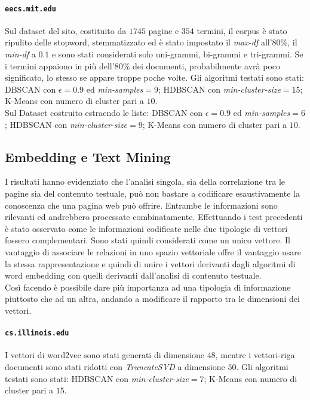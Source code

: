 \paragraph{\texttt{eecs.mit.edu}}
Sul dataset del sito, costituito da $1745$ pagine e $354$ termini, il corpus è stato ripulito delle stopword, stemmatizzato ed è stato impostato il \textit{max-df} all'80\%, il \textit{min-df} a $0.1$ e sono stati considerati solo uni-grammi, bi-grammi e tri-grammi. Se i termini appaiono in più dell'80\% dei documenti, probabilmente avrà poco significato, lo stesso se appare troppe poche volte. Gli algoritmi testati sono stati: DBSCAN con $\epsilon = 0.9$ ed \textit{min-samples}$ = 9$; HDBSCAN con \textit{min-cluster-size}$=15$; K-Means con numero di cluster pari a $10$. \\Sul Dataset costruito estraendo le liste: DBSCAN con $\epsilon = 0.9$ ed \textit{min-samples}$ = 6$; HDBSCAN con \textit{min-cluster-size}$=9$; K-Means con numero di cluster pari a $10$. 

\subsection{Embedding e Text Mining}
I risultati hanno evidenziato che l'analisi singola, sia della correlazione tra le pagine sia del contenuto testuale, può non bastare a codificare esaustivamente la conoscenza che una pagina web può offrire. Entrambe le informazioni sono rilevanti ed andrebbero processate combinatamente. Effettuando i test precedenti è stato osservato come le informazioni codificate nelle due tipologie di vettori fossero complementari. Sono stati quindi considerati come un unico vettore. Il vantaggio di associare le relazioni in uno spazio vettoriale offre il vantaggio usare la stessa rappresentazione e quindi di unire i vettori derivanti dagli algoritmi di word embedding con quelli derivanti dall'analisi di contenuto testuale. 
\\
Così facendo è possibile dare più importanza ad una tipologia di informazione piuttosto che ad un altra, andando a modificare il rapporto tra le dimensioni dei vettori.


\paragraph{\texttt{cs.illinois.edu}} I vettori di word2vec sono stati generati di dimensione $48$, mentre i vettori-riga documenti sono stati ridotti con \textit{TruncateSVD} a dimensione $50$. Gli algoritmi testati sono stati: HDBSCAN con \textit{min-cluster-size}$=7$; K-Means con numero di cluster pari a $15$. 

